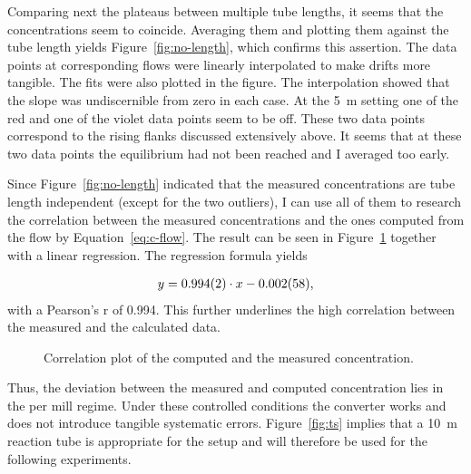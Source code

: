 Comparing next the  plateaus between multiple tube lengths, it
seems that the concentrations seem to coincide. Averaging them and
plotting them against the tube length yields
Figure~\ref{fig:no-length}, which confirms this assertion. The data
points at corresponding flows were linearly interpolated to make
drifts more tangible. The fits were also plotted in the figure. The
interpolation showed that the slope was undiscernible from zero in
each case. At the \SI{5}{\meter} setting one of the red and one of the
violet data points seem to be off. These two data points correspond to
the rising flanks discussed extensively above. It seems that at these
two data points the equilibrium had not been reached and I averaged
too early.

Since Figure~\ref{fig:no-length} indicated that the measured
concentrations are tube length independent (except for the two
outliers), I can use all of them to research the correlation between
the measured concentrations and the ones computed from the flow by
Equation~\eqref{eq:c-flow}. The result can be seen in
Figure~\ref{fig:no-calib} together with a linear regression. The
regression formula yields

\begin{align*}
  y = \num{0.994 \pm 0.002}  \cdot x -\num{0.002 \pm 0.058},
\end{align*}
with a Pearson's r of 0.994. This further underlines the high
correlation between the measured and the calculated data.

\begin{figure}[htbp]
  \centering
  
  \caption{Correlation plot of the computed and the measured 
    concentration.}
  \label{fig:no-calib}
\end{figure}

Thus, the deviation between the measured and computed concentration
lies in the per mill regime. Under these controlled conditions the
converter works and does not introduce tangible systematic
errors. Figure~\ref{fig:ts} implies that a \SI{10}{\meter} reaction
tube is appropriate for the setup and will therefore be used for the
following experiments.

